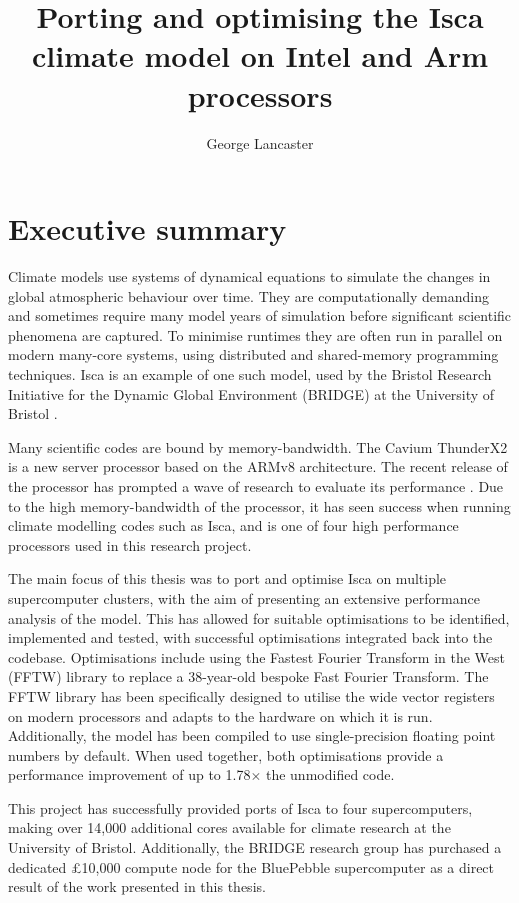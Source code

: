 \documentclass[a4paper,11pt]{report}
\title{Porting and optimising the Isca climate model on Intel and Arm processors}
\author{George Lancaster}
\begin{document}

\chapter*{Executive summary}
Climate models use systems of dynamical equations to simulate the changes in global atmospheric behaviour over time. They are computationally demanding and sometimes require many model years of simulation before significant scientific phenomena are captured. To minimise runtimes they are often run in parallel on modern many-core systems, using distributed and shared-memory programming techniques. Isca is an example of one such model, used by the Bristol Research Initiative for the Dynamic Global Environment (BRIDGE) at the University of Bristol \cite{vallis2018isca}.
\par
Many scientific codes are bound by memory-bandwidth. The Cavium ThunderX2 is a new server processor based on the ARMv8 architecture. The recent release of the processor has prompted a wave of research to evaluate its performance \cite{calore2018advanced,mcintosh2018performance}. Due to the high memory-bandwidth of the processor, it has seen success when running climate modelling codes such as Isca, and is one of four high performance processors used in this research project.
\par
The main focus of this thesis was to port and optimise Isca on multiple supercomputer clusters, with the aim of presenting an extensive performance analysis of the model. This has allowed for suitable optimisations to be identified, implemented and tested, with successful optimisations integrated back into the codebase. Optimisations include using the Fastest Fourier Transform in the West (FFTW) library to replace a 38-year-old bespoke Fast Fourier Transform. The FFTW library has been specifically designed to utilise the wide vector registers on modern processors and adapts to the hardware on which it is run. Additionally, the model has been compiled to use single-precision floating point numbers by default. When used together, both optimisations provide a performance improvement of up to 1.78$\times$ the unmodified code. 
\par
This project has successfully provided ports of Isca to four supercomputers, making over 14,000 additional cores available for climate research at the University of Bristol. Additionally, the BRIDGE research group has purchased a dedicated £10,000 compute node for the BluePebble supercomputer as a direct result of the work presented in this thesis. 
\end{document}
